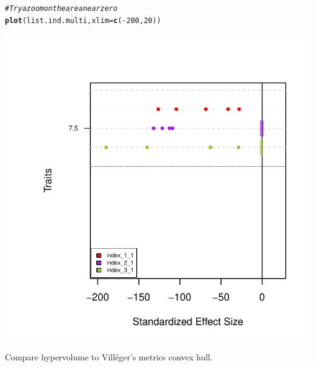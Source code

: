 \documentclass[12pt]{article}\usepackage[]{graphicx}\usepackage[]{color}
\makeatletter
\def\maxwidth{ %
  \ifdim\Gin@nat@width>\linewidth
    \linewidth
  \else
    \Gin@nat@width
  \fi
}
\newcommand{\hlnum}[1]{\textcolor[rgb]{0.686,0.059,0.569}{#1}}%
\newcommand{\hlcom}[1]{\textcolor[rgb]{0.678,0.584,0.686}{\textit{#1}}}%
\newcommand{\hlopt}[1]{\textcolor[rgb]{0,0,0}{#1}}%
\newcommand{\hlstd}[1]{\textcolor[rgb]{0.345,0.345,0.345}{#1}}%
\newcommand{\hlkwc}[1]{\textcolor[rgb]{0.333,0.667,0.333}{#1}}%
\newcommand{\hlkwd}[1]{\textcolor[rgb]{0.737,0.353,0.396}{\textbf{#1}}}%
\newenvironment{kframe}{%
 \def\at@end@of@kframe{}%
 \ifinner\ifhmode%
  \def\at@end@of@kframe{\end{minipage}}%
  \begin{minipage}{\columnwidth}%
 \fi\fi%
 \def\FrameCommand##1{\hskip\@totalleftmargin \hskip-\fboxsep
 \colorbox{shadecolor}{##1}\hskip-\fboxsep
     \hskip-\linewidth \hskip-\@totalleftmargin \hskip\columnwidth}%
 \MakeFramed {\advance\hsize-\width
   \@totalleftmargin\z@ \linewidth\hsize
   \@setminipage}}%
 {\par\unskip\endMakeFramed%
 \at@end@of@kframe}
\newenvironment{knitrout}{}{} %
\makeatother
\begin{document}
\begin{knitrout}
{}


\begin{kframe}\begin{alltt}
\hlcom{#Try a zoom on the area near zero}
\hlkwd{plot}\hlstd{(list.ind.multi,} \hlkwc{xlim} \hlstd{=} \hlkwd{c}\hlstd{(}\hlopt{-}\hlnum{200}\hlstd{,}\hlnum{20}\hlstd{))}
\end{alltt}
\end{kframe}

{\centering \includegraphics[width=\maxwidth]{figure/unnamed-chunk-592} 

}



\end{knitrout}

Compare hypervolume to Villéger's metrics convex hull.
\end{document}
